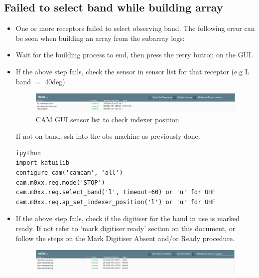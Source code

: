 \subsection{ Failed to select band while building array}
\begin{itemize}
\item{} One or more receptors failed to select observing band. The following error can be seen when building an array from the subarray logs:\\  
\item{} Wait for the building process to end, then press the retry button on the GUI.
\item{} If the above step fails, check the  sensor in sensor list for that receptor (e.g L band $=$ 40\unit{deg})






\begin{figure}[!thb]
	\centering
	\includegraphics[scale=0.37]{Chapters/images/image72.png}
	
	\caption{CAM GUI sensor list to check indexer position}
	\label{fig:image72}
\end{figure}

If not on band, ssh into the obs machine as previously done.
\begin{lstlisting}[style=DOS]
ipython
import katuilib
configure_cam('camcam', 'all')
cam.m0xx.req.mode('STOP')
cam.m0xx.req.select_band('l', timeout=60) or 'u' for UHF  
cam.m0xx.req.ap_set_indexer_position('l') or 'u' for UHF
\end{lstlisting}


\item{} If the above step fails, check if the digitiser for the band in use is marked ready. If not refer to ‘mark digitiser ready’ section on this document, or follow the steps on the  Mark Digitiser Absent and/or Ready procedure.

\begin{figure}[!thb]
	\centering
	\includegraphics[scale=0.37]{Chapters/images/image9.png}
	

\end{figure}
\end{itemize}
